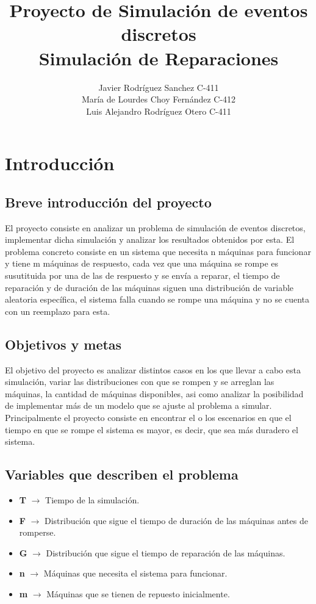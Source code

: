 \documentclass[11pt]{article}
\author{
    Javier Rodríguez Sanchez C-411 \\ 
    María de Lourdes Choy Fernández C-412 \\ 
    Luis Alejandro Rodríguez Otero C-411
    }
\title{Proyecto de Simulación de eventos discretos \\ Simulación de Reparaciones}
\begin{document}
 
    \maketitle
    \newpage

    \tableofcontents
    \newpage

    \section{Introducción}

    \subsection{Breve introducción del proyecto}
    El proyecto consiste en analizar un problema de simulación de eventos discretos, implementar 
    dicha simulación y analizar los resultados obtenidos por esta. El problema concreto consiste 
    en un sistema que necesita n máquinas para funcionar y tiene m máquinas de respuesto, cada vez 
    que una máquina se rompe es susutituida por una de las de respuesto y se envía a reparar, el 
    tiempo de reparación y de duración de las máquinas siguen una distribución de variable aleatoria 
    específica, el sistema falla cuando se rompe una máquina y no se cuenta con un reemplazo para esta.


    \subsection{Objetivos y metas}
    El objetivo del proyecto es analizar distintos casos en los que llevar a cabo esta simulación, 
    variar las distribuciones con que se rompen y se arreglan las máquinas, la cantidad de máquinas 
    disponibles, asi como analizar la posibilidad de implementar más de un modelo que se ajuste al 
    problema a simular. Principalmente el proyecto consiste en encontrar el o los escenarios en que 
    el tiempo en que se rompe el sistema es mayor, es decir, que sea más duradero el sistema.


    \subsection{Variables que describen el problema}
    \begin{itemize}
        \item \textbf{T} $\longrightarrow$ Tiempo de la simulación.

        \item \textbf{F} $\longrightarrow$ Distribución que sigue el tiempo de duración de las máquinas antes 
        de romperse.
        
        \item \textbf{G} $\longrightarrow$ Distribución que sigue el tiempo de reparación de las máquinas.
        
        \item \textbf{n} $\longrightarrow$ Máquinas que necesita el sistema para funcionar.
        
        \item \textbf{m} $\longrightarrow$ Máquinas que se tienen de repuesto inicialmente.
    \end{itemize}
\end{document}
